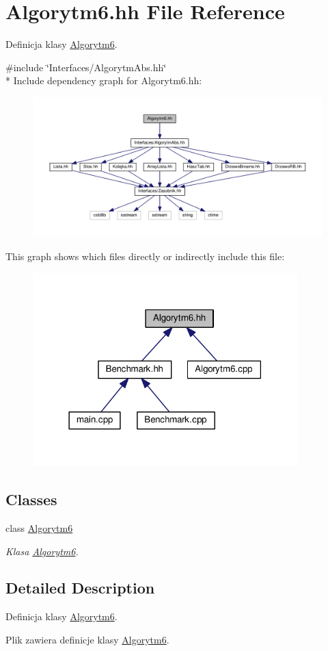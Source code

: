 \hypertarget{a00031}{}\section{Algorytm6.\+hh File Reference}
\label{a00031}


Definicja klasy \hyperlink{a00007}{Algorytm6}.  


{\ttfamily \#include \char`\"{}Interfaces/\+Algorytm\+Abs.\+hh\char`\"{}}\\*
Include dependency graph for Algorytm6.\+hh\+:
\nopagebreak
\begin{figure}[H]
\begin{center}
\leavevmode
\includegraphics[width=350pt]{a00076}
\end{center}
\end{figure}
This graph shows which files directly or indirectly include this file\+:
\nopagebreak
\begin{figure}[H]
\begin{center}
\leavevmode
\includegraphics[width=290pt]{a00077}
\end{center}
\end{figure}
\subsection*{Classes}
\begin{DoxyCompactItemize}
\item 
class \hyperlink{a00007}{Algorytm6}
\begin{DoxyCompactList}\small\item\em Klasa \hyperlink{a00007}{Algorytm6}. \end{DoxyCompactList}\end{DoxyCompactItemize}


\subsection{Detailed Description}
Definicja klasy \hyperlink{a00007}{Algorytm6}. 

Plik zawiera definicje klasy \hyperlink{a00007}{Algorytm6}. 